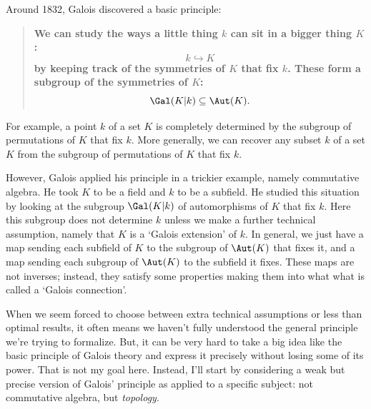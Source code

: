\documentclass{amsart}
\begin{document}
Around 1832, Galois discovered a basic principle:

\begin{quote}
\textbf{We can study the ways a little thing $k$ can sit 
in a bigger thing $K$:
\[               k \hookrightarrow K   \]
by keeping track of the symmetries of $K$ that fix $k$.
These form a subgroup of the symmetries of $K$:
\[             \Gal(K|k) \subseteq \Aut(K).   \]
}
\end{quote}
For example, a point $k$ of a set $K$ is completely determined by the
subgroup of permutations of $K$ that fix $k$.  More generally, we
can recover any subset $k$ of a set $K$ from the subgroup of permutations 
of $K$ that fix $k$.

However, Galois applied his principle in a trickier example, namely
commutative algebra.  He took $K$ to be a field and $k$ to be a
subfield.  He studied this situation by looking at the subgroup
$\Gal(K|k)$ of automorphisms of $K$ that fix $k$.  Here this subgroup
does not determine $k$ unless we make a further technical assumption,
namely that $K$ is a `Galois extension' of $k$.  In general, we just
have a map sending each subfield of $K$ to the subgroup of $\Aut(K)$ that
fixes it, and a map sending each subgroup of $\Aut(K)$ to the subfield
it fixes.  These maps are not inverses; instead, they satisfy some
properties making them into what what is called a `Galois connection'.

When we seem forced to choose between extra technical assumptions or
less than optimal results, it often means we haven't fully understood the
general principle we're trying to formalize.  But, it can be very hard to 
take a big idea like the basic principle of Galois theory and express 
it precisely without losing some of its power.  That is not my goal
here.  Instead, I'll start by considering a weak but precise version 
of Galois' principle as applied to a specific subject: not commutative 
algebra, but {\it topology}.  
\end{document}
